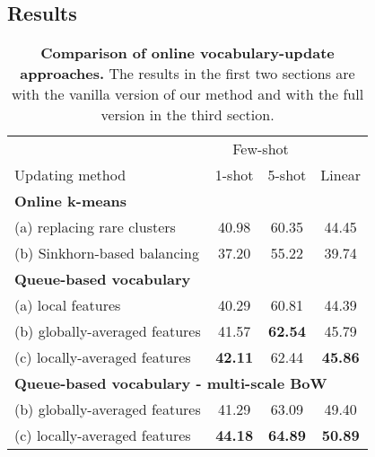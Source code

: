 \documentclass[final]{cvpr}
\begin{document}
\subsection{Results}

\begin{table}[t!]
\centering
\renewcommand{\figurename}{Table}
\renewcommand{\captionlabelfont}{\bf}
\renewcommand{\captionfont}{\small} 
{\setlength{\extrarowheight}{2pt}\small
{
\begin{tabular}{ l  | c   c  | c  }
\toprule
& \multicolumn{2}{c|}{Few-shot} & \multicolumn{1}{l}{}\\
\multicolumn{1}{l|}{Updating method} & \multicolumn{1}{c}{1-shot} & \multicolumn{1}{c|}{5-shot} & \multicolumn{1}{l}{Linear}\\
\midrule
\multicolumn{4}{l}{\textbf{Online k-means}} \\
\;(a) replacing rare clusters   & 40.98 & 60.35 & 44.45\\
\;(b) Sinkhorn-based balancing  & 37.20 & 55.22 & 39.74\\
\midrule
\multicolumn{4}{l}{\textbf{Queue-based vocabulary}} \\
\;(a) local features             & 40.29 & 60.81 & 44.39\\
\;(b) globally-averaged features & 41.57 & \textbf{62.54} & 45.79\\
\;(c) locally-averaged features  & \textbf{42.11} & 62.44 & \textbf{45.86}\\
\midrule
\multicolumn{4}{l}{\textbf{Queue-based vocabulary - multi-scale BoW}} \\
\;(b) globally-averaged features & 41.29 & 63.09 & 49.40\\
\;(c) locally-averaged features  & \textbf{44.18} & \textbf{64.89} & \textbf{50.89}\\
\bottomrule
\end{tabular}}}
\vspace{-8pt}
\caption{
\textbf{Comparison of online vocabulary-update approaches.}
The results in the first two sections are with the vanilla version of our method and with the full version in the third section.
}
\vspace{-12pt}
\label{tab:results_vocabulary_update}
\end{table}
\end{document}
